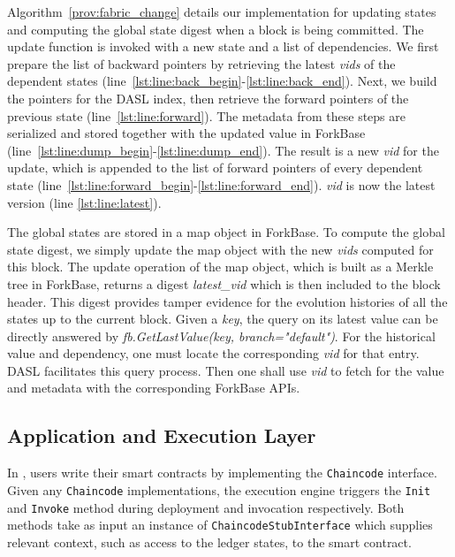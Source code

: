 Algorithm~\ref{prov:fabric_change} details our implementation for updating states
and computing the global state digest when a block is being
committed. The update function is invoked with a new state
and a list of dependencies. We first prepare the list of backward pointers by retrieving the latest {\em vids} of the dependent
states (line~\ref{lst:line:back_begin}-\ref{lst:line:back_end}). Next, we build the pointers for the DASL
index, then retrieve the forward pointers
of the previous state (line~\ref{lst:line:forward}). The metadata from these steps are serialized and stored together with the updated
value in ForkBase (line~\ref{lst:line:dump_begin}-\ref{lst:line:dump_end}). The result is a new {\em vid} for
the update, which is appended to the list of forward pointers of every dependent state
(line~\ref{lst:line:forward_begin}-\ref{lst:line:forward_end}). {\em vid} is now 
the latest version (line \ref{lst:line:latest}). 

The global states are stored in a map object in ForkBase. To compute the global state digest, we simply update
the map object with the new {\em vids} computed for this block. The update operation of the map object, which
is built as a Merkle tree in ForkBase, returns a digest {\em latest\_vid} which is then included
to the block header.  This digest provides tamper evidence for the evolution histories of all the states up to
the current block.
Given a {\em key}, the query on its latest value can be directly answered by \textit{fb.GetLastValue(key, branch="default")}. For the historical value and dependency, one must locate the corresponding {\em vid} for that entry. 
DASL facilitates this query process. 
Then one shall use {\em vid} to fetch for the value and metadata with the corresponding ForkBase APIs. 

\subsection{Application and Execution Layer}
In {\fs}, users write their smart contracts by implementing the \texttt{Chaincode} interface. Given any  \texttt{Chaincode} implementations, the execution engine triggers the \texttt{Init} and \texttt{Invoke} method during deployment and
invocation respectively. Both methods take as input an instance of \texttt{ChaincodeStubInterface} which
supplies relevant context, such as access to the ledger states, to the smart contract. 

